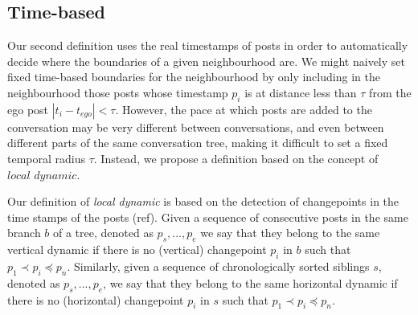 \documentclass[conference]{IEEEtran}
\begin{document}
\subsection{Time-based}
Our second definition uses the real timestamps of posts in order to automatically decide where the boundaries of a given neighbourhood are. We might naively set fixed time-based boundaries for the neighbourhood by only including in the neighbourhood those posts whose timestamp $p_i$ is at distance less than $\tau$ from the ego post $|t_i-t_{ego}|<\tau$. However, the pace at which posts are added to the conversation may be very different between conversations, and even between different parts of the same conversation tree, making it difficult to set a fixed temporal radius $\tau$. Instead, we propose a definition based on the concept of $\textit{local dynamic}$. 

Our definition of \textit{local dynamic} is based on the detection of changepoints in the time stamps of the posts (ref). Given a sequence of consecutive posts in the same branch $b$ of a tree, denoted as $p_s,...,p_e$ we say that they belong to the same vertical dynamic if there is no (vertical) changepoint $p_i$ in $b$ such that $p_1 \prec p_i \preceq p_n$. Similarly, given a sequence of chronologically sorted  siblings $s$, denoted as $p_s,...,p_e$, we say that they belong to the same horizontal dynamic if there is no (horizontal) changepoint $p_i$ in $s$ such that $p_1 \prec p_i \preceq p_n$. 
\end{document}
